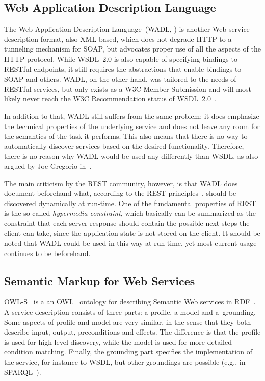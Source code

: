 \documentclass[smallextended]{svjour3}
\newcommand{\owls}{\mbox{OWL-S}}
\begin{document}
\subsection{Web Application Description Language}
The Web Application Description Language~(WADL, \cite{WADL}) is another Web service description format, also XML-based, which does not degrade HTTP to a tunneling mechanism for SOAP, but advocates proper use of all the aspects of the HTTP protocol. While WSDL~2.0 is also capable of specifying bindings to RESTful endpoints, it still requires the abstractions that enable bindings to SOAP and others. WADL, on the other hand, was tailored to the needs of RESTful services, but only exists as a W3C Member Submission and will most likely never reach the W3C Recommendation status of WSDL~2.0~\cite{WADLTeamComment}.

In addition to that, WADL still suffers from the same problem: it does emphasize the technical properties of the underlying service and does not leave any room for the semantics of the task it performs. This also means that there is no way to automatically discover services based on the desired functionality. Therefore, there is no reason why WADL would be used any differently than WSDL, as also argued by Joe Gregorio in~\cite{GregorioWADL}.

The main criticism by the REST community, however, is that WADL does document beforehand what, according to the REST principles~\cite{FieldingREST}, should be discovered dynamically at run-time. One of the fundamental properties of REST is the so-called \emph{hypermedia constraint}, which basically can be summarized as the constraint that each server response should contain the possible next steps the client can take, since the application state is not stored on the client. It should be noted that WADL could be used in this way at run-time, yet most current usage continues to be beforehand.

\subsection{Semantic Markup for Web Services}

\owls~\cite{OWLS} is a an OWL~\cite{OWL} ontology for describing Semantic Web services in RDF~\cite{RDF}. A service description consists of three parts: a profile, a model and a~grounding. Some aspects of profile and model are very similar, in the sense that they both describe input, output, preconditions and effects. The difference is that the profile is used for high-level discovery, while the model is used for more detailed condition matching.
Finally, the grounding part specifies the implementation of the service, for instance to WSDL, but other groundings are possible (e.g., in SPARQL~\cite{Verborgh:2010p2746}). 
\end{document}
